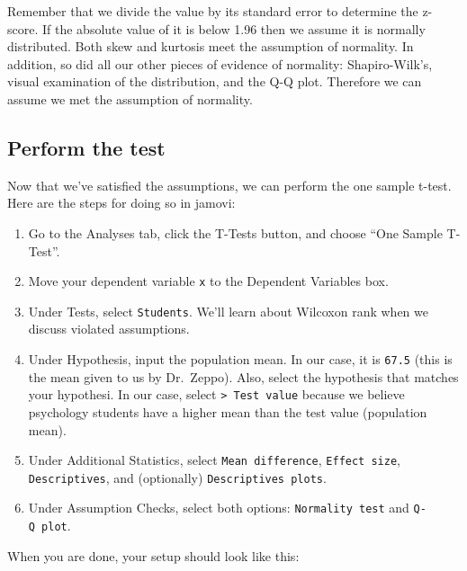 \documentclass[
]{book}
\begin{document}
Remember that we divide the value by its standard error to determine the z-score. If the absolute value of it is below 1.96 then we assume it is normally distributed. Both skew and kurtosis meet the assumption of normality. In addition, so did all our other pieces of evidence of normality: Shapiro-Wilk's, visual examination of the distribution, and the Q-Q plot. Therefore we can assume we met the assumption of normality.

\hypertarget{perform-the-test}{%
\subsection{Perform the test}\label{perform-the-test}}

Now that we've satisfied the assumptions, we can perform the one sample t-test. Here are the steps for doing so in jamovi:

\begin{enumerate}
\def\labelenumi{\arabic{enumi}.}
\item
  Go to the Analyses tab, click the T-Tests button, and choose ``One Sample T-Test''.
\item
  Move your dependent variable \texttt{x} to the Dependent Variables box.
\item
  Under Tests, select \texttt{Student\textquotesingle{}s}. We'll learn about Wilcoxon rank when we discuss violated assumptions.
\item
  Under Hypothesis, input the population mean. In our case, it is \texttt{67.5} (this is the mean given to us by Dr.~Zeppo). Also, select the hypothesis that matches your hypothesi. In our case, select \texttt{\textgreater{}\ Test\ value} because we believe psychology students have a higher mean than the test value (population mean).
\item
  Under Additional Statistics, select \texttt{Mean\ difference}, \texttt{Effect\ size}, \texttt{Descriptives}, and (optionally) \texttt{Descriptives\ plots}.
\item
  Under Assumption Checks, select both options: \texttt{Normality\ test} and \texttt{Q-Q\ plot}.
\end{enumerate}

When you are done, your setup should look like this:
\end{document}

